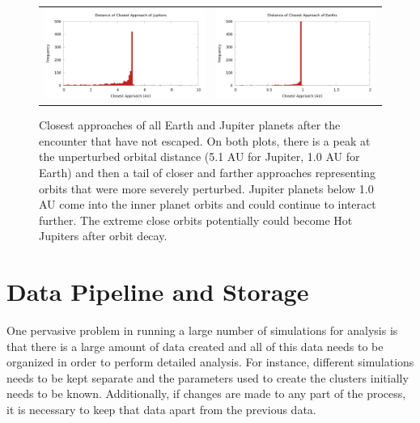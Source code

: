 \documentclass[12pt]{article}
\begin{document}
    \begin{figure}[H]
        \centering
        \caption{Closest approaches of all Earth and Jupiter planets after 
            the encounter that have not escaped. On both plots, there is a peak
            at the unperturbed orbital distance (5.1 AU for Jupiter, 1.0 AU for
            Earth) and then a tail of closer and farther approaches representing
            orbits that were more severely perturbed. Jupiter planets below 1.0 AU
            come into the inner planet orbits and could continue to interact further.
            The extreme close orbits potentially could become Hot Jupiters after
            orbit decay.
        }
        \begin{tabular}{cc}
            \includegraphics[width=3.25in]{jupiter_distance_final} &
            \includegraphics[width=3.25in]{earth_distance_final}
        \end{tabular}
    \end{figure}




\section{Data Pipeline and Storage}

    One pervasive problem in running a large number of simulations for analysis is
    that there is a large amount of data created and all of this data needs to be
    organized in order to perform detailed analysis. For instance, different simulations
    needs to be kept separate and the parameters used to create the clusters initially
    needs to be known. Additionally, if changes are made to any part of the process, it
    is necessary to keep that data apart from the previous data.
\end{document}
